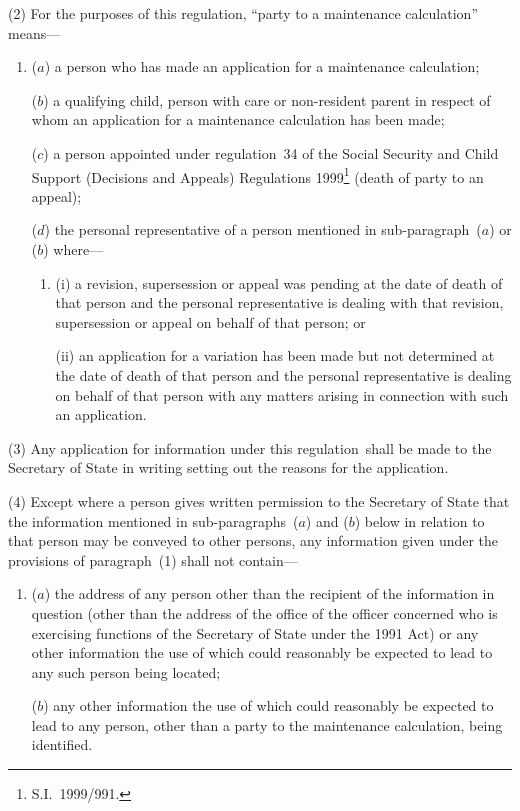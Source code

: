 \documentclass[12pt,a4paper]{article}
\begin{document}
(2) For the purposes of this regulation, “party to a maintenance calculation” means—
\begin{enumerate}\item[]
($a$) a person who has made an application for a maintenance calculation;

($b$) a qualifying child, person with care or non-resident parent in respect of whom an application for a maintenance calculation has been made;

($c$) a person appointed under regulation~34 of the Social Security and Child Support (Decisions and Appeals) Regulations 1999\footnote{S.I.~1999/991.} (death of party to an appeal);

($d$) the personal representative of a person mentioned in sub-\hspace{0pt}paragraph~($a$)  or ($b$)  where—
\begin{enumerate}\item[]
(i) a revision, supersession or appeal was pending at the date of death of that person and the personal representative is dealing with that revision, supersession or appeal on behalf of that person; or

(ii) an application for a variation has been made but not determined at the date of death of that person and the personal representative is dealing on behalf of that person with any matters arising in connection with such an application.
\end{enumerate}
\end{enumerate}

(3) Any application for information under this regulation~shall be made to the 
Secretary of State  %
in writing setting out the reasons for the application.

(4) Except where a person gives written permission to the 
Secretary of State  %
that the information mentioned in sub-paragraphs~($a$)  and ($b$)  below in relation to that person may be conveyed to other persons, any information given under the provisions of paragraph~(1) shall not contain—
\begin{enumerate}\item[]
($a$) the address of any person other than the recipient of the information in question (other than the address of the office of the officer concerned who is exercising functions of the 
Secretary of State  %
under the 1991 Act) or any other information the use of which could reasonably be expected to lead to any such person being located;

($b$) any other information the use of which could reasonably be expected to lead to any person, other than a party to the maintenance calculation, being identified.
\end{enumerate}
\end{document}

